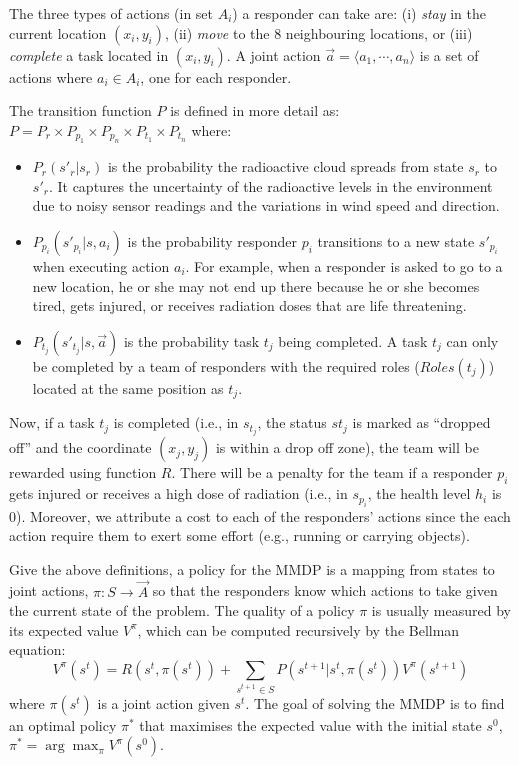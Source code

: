 The three types of actions  (in set $A_i$) a responder can take
are: (i) {\em stay} in the current location $(x_i, y_i)$, (ii) {\em
move} to the 8 neighbouring locations, or (iii) {\em complete} a
task located in $(x_i, y_i)$. A joint action $\vec{a}=\langle a_1,
\cdots, a_n \rangle$ is a set of actions where $a_i\in A_i$, one
for each responder.

The transition function $P$ is defined in more detail as: $P= P_r
\times P_{p_1} \times P_{p_n} \times P_{t_1} \times P_{t_n}$ where:
\begin{itemize}
    \itemsep=-2pt
    \item $P_r(s'_r|s_r)$ is the probability the
        radioactive cloud spreads from state $s_r$ to $s'_r$.
        It captures the uncertainty of the  radioactive
        levels in the environment due to  noisy sensor
        readings and the variations in wind speed and direction.
    \item $P_{p_i}(s'_{p_i}|s, a_i)$ is the probability
        responder $p_i$ transitions to a new state $s'_{p_i}$
        when executing action $a_i$. For example, when a
        responder is asked to go to a new location, he or she
        may not end up there because he or she becomes tired, gets
        injured, or receives radiation doses that are life
        threatening.
    \item $P_{t_j}(s'_{t_j}|s, \vec{a})$ is the probability
        task $t_j$ being completed. A task $t_j$ can only be completed by a
        team of responders with the required roles ($Roles(t_j)$) located at the
        same position as $t_j$.
\end{itemize}

Now,  if a task $t_j$ is completed (i.e., in $s_{t_j}$, the status
$st_j$ is marked as ``dropped off'' and the coordinate $(x_j, y_j)$
is within a drop off zone), the team will be rewarded using
function $R$. There will be a penalty for the team if a responder
$p_i$ gets injured or receives a high dose of radiation (i.e., in
$s_{p_i}$, the health level $h_i$ is 0). Moreover, we attribute a
cost to each of the responders' actions since the each  action require them to
exert some effort (e.g., running or carrying objects).


Give the above definitions, a policy for the MMDP is a mapping from
states to joint actions, $\pi: S \rightarrow \vec{A}$ so that the
responders know which actions to take given the current state of
the problem. The quality of a policy $\pi$ is usually measured by
its expected value $V^\pi$, which can be computed recursively by
the Bellman equation:
\begin{equation}
  V^\pi(s^t) = R(s^t, \pi(s^t)) + \!\!\!\sum_{s^{t+1}\in S}\!\!\!
  P(s^{t+1}|s^t, \pi(s^t)) V^\pi(s^{t+1})
\end{equation}
where $\pi(s^t)$ is a joint action given $s^t$. The goal of solving
the MMDP is to find an optimal policy $\pi^*$ that maximises the
expected value with the initial state $s^0$, $\pi^* =
\arg\max_{\pi} V^\pi(s^0)$.

